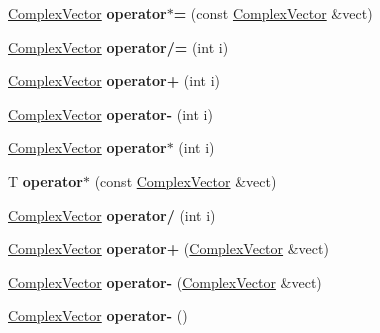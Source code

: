 \begin{DoxyCompactItemize}
\hyperlink{class_complex_vector}{Complex\+Vector} {\bfseries operator$\ast$=} (const \hyperlink{class_complex_vector}{Complex\+Vector} \&vect)
\item 
\mbox{\label{class_complex_vector_a7eeedf940440c7bff9aa6cda1780d595}} 
\hyperlink{class_complex_vector}{Complex\+Vector} {\bfseries operator/=} (int i)
\item 
\mbox{\label{class_complex_vector_a2034f4b7fe2a63de239856978243bcda}} 
\hyperlink{class_complex_vector}{Complex\+Vector} {\bfseries operator+} (int i)
\item 
\mbox{\label{class_complex_vector_af5066c39caaf4f1271441dbba27db04b}} 
\hyperlink{class_complex_vector}{Complex\+Vector} {\bfseries operator-\/} (int i)
\item 
\mbox{\label{class_complex_vector_a91966c156c52dbda8c7f6a2396bf1d27}} 
\hyperlink{class_complex_vector}{Complex\+Vector} {\bfseries operator$\ast$} (int i)
\item 
\mbox{\label{class_complex_vector_ac35edf496d1c0ad8c5abae3120a65557}} 
T {\bfseries operator$\ast$} (const \hyperlink{class_complex_vector}{Complex\+Vector} \&vect)
\item 
\mbox{\label{class_complex_vector_aa9f19d8cd92fef73be3865a0336d07e6}} 
\hyperlink{class_complex_vector}{Complex\+Vector} {\bfseries operator/} (int i)
\item 
\mbox{\label{class_complex_vector_ac3bd7d935a388e0411dd51d21bdc2289}} 
\hyperlink{class_complex_vector}{Complex\+Vector} {\bfseries operator+} (\hyperlink{class_complex_vector}{Complex\+Vector} \&vect)
\item 
\mbox{\label{class_complex_vector_a1c511ee3c5a5b4cd6df9e2cd15def552}} 
\hyperlink{class_complex_vector}{Complex\+Vector} {\bfseries operator-\/} (\hyperlink{class_complex_vector}{Complex\+Vector} \&vect)
\item 
\mbox{\label{class_complex_vector_a8cb7716283b931869c851ef9a12ef2eb}} 
\hyperlink{class_complex_vector}{Complex\+Vector} {\bfseries operator-\/} ()

\end{DoxyCompactItemize}
